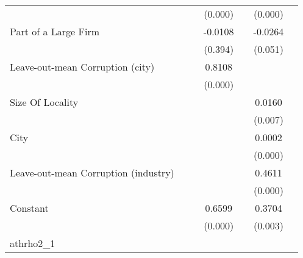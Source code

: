{\begin{tabular}{l*{6}{c}}
                    &                     &                     &     (0.000)         &                     &     (0.000)         &                     \\
Part of a Large Firm&                     &                     &     -0.0108         &                     &     -0.0264         &                     \\
                    &                     &                     &     (0.394)         &                     &     (0.051)         &                     \\
Leave-out-mean Corruption (city)&                     &                     &      0.8108\sym{***}&                     &                     &                     \\
                    &                     &                     &     (0.000)         &                     &                     &                     \\
Size Of Locality    &                     &                     &                     &                     &      0.0160\sym{**} &                     \\
                    &                     &                     &                     &                     &     (0.007)         &                     \\
City                &                     &                     &                     &                     &      0.0002\sym{***}&                     \\
                    &                     &                     &                     &                     &     (0.000)         &                     \\
Leave-out-mean Corruption (industry)&                     &                     &                     &                     &      0.4611\sym{***}&                     \\
                    &                     &                     &                     &                     &     (0.000)         &                     \\
Constant            &                     &                     &      0.6599\sym{***}&                     &      0.3704\sym{**} &                     \\
                    &                     &                     &     (0.000)         &                     &     (0.003)         &                     \\
\hline
athrho2\_1           &                     &                     &                     &                     &                     &                     \\

\end{tabular}}
